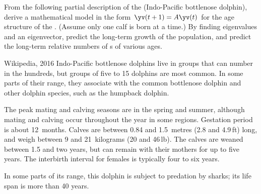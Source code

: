 \begin{exercise} \label{ex:} 
From the following partial description of the  (Indo-Pacific bottlenose dolphin), 
derive a mathematical model in the form \(\yv(t+1)=A\yv(t)\) for the age structure of the .
(Assume only one calf is born at a time.)
By finding eigenvalues and an eigenvector, predict the long-term growth of the population, and predict the long-term relative numbers of s of various ages.
\begin{quoted}{Wikipedia, 2016}
Indo-Pacific bottlenose dolphins live in groups that can number in the hundreds, but groups of five to 15 dolphins are most common.  In some parts of their range, they associate with the common bottlenose dolphin and other dolphin species, such as the humpback dolphin.

The peak mating and calving seasons are in the spring and summer, although mating and calving occur throughout the year in some regions. Gestation period is about 12~months. Calves are between 0.84 and 1.5~metres (2.8 and 4.9\,ft) long, and weigh between 9 and 21~kilograms (20 and 46\,lb). The calves are weaned between 1.5 and two years, but can remain with their mothers for up to five years. The interbirth interval for females is typically four to six years.

In some parts of its range, this dolphin is subject to predation by sharks; its life span is more than 40 years.
\end{quoted}
\end{exercise}






